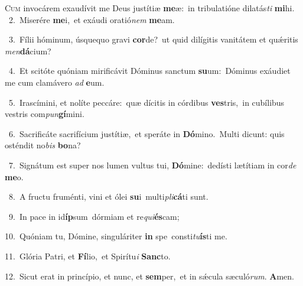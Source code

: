 \lettrine{\initial\textcolor{\initialcolor}{C}}{um} invocárem exaudívit me Deus justítiæ \textbf{me}\-æ:~\star in tribulatióne dilatás\textit{ti} \textbf{mi}\-hi.\\
{\numbfont\textcolor{\numbcolor}{~2.}}~Miserére \textbf{me}\-i,~\star et exáudi oratió\textit{nem} \textbf{me}\-am.\par
{\numbfont\textcolor{\numbcolor}{~3.}}~Fílii hóminum, úsquequo gravi \textbf{cor}\-de?~\star ut quid dilígitis vanitátem et quǽritis \textit{men}\-\textbf{dá}cium?\par
{\numbfont\textcolor{\numbcolor}{~4.}}~Et scitóte quóniam mirificávit Dóminus sanctum \textbf{su}\-um:~\star Dóminus exáudiet me cum clamávero \textit{ad} \textbf{e}\-um.\par
{\numbfont\textcolor{\numbcolor}{~5.}}~Irascímini, et nolíte peccáre:~\dagger quæ dícitis in córdibus \textbf{ves}\-tris,~\star in cubílibus vestris com\-\textit{pun}\-\textbf{gí}mini.\par
{\numbfont\textcolor{\numbcolor}{~6.}}~Sacrificáte sacrifícium justítiæ,~\dagger et speráte in \textbf{Dó}\-mino.~\star Multi dicunt: quis osténdit no\textit{bis} \textbf{bo}\-na?\par
{\numbfont\textcolor{\numbcolor}{~7.}}~Signátum est super nos lumen vultus tui, \textbf{Dó}\-mine:~\star dedísti lætítiam in cor\textit{de} \textbf{me}\-o.\par
{\numbfont\textcolor{\numbcolor}{~8.}}~A fructu fruménti, vini et ólei \textbf{su}\-i~\star multi\-\textit{pli}\-\textbf{cá}ti sunt.\par
{\numbfont\textcolor{\numbcolor}{~9.}}~In pace in id\-\textbf{íp}\-sum~\star dórmiam et re\-\textit{qui}\-\textbf{és}cam;\par
{\numbfont\textcolor{\numbcolor}{10.}}~Quóniam tu, Dómine, singuláriter \textbf{in} spe~\star consti\-\textit{tu}\-\textbf{ís}ti me.\par
{\numbfont\textcolor{\numbcolor}{11.}}~Glória Patri, et \textbf{Fí}\-lio,~\star et Spirítu\textit{i} \textbf{Sanc}\-to.\par
{\numbfont\textcolor{\numbcolor}{12.}}~Sicut erat in princípio, et nunc, et \textbf{sem}\-per,~\star et in sǽcula sæculó\-\textit{rum}\-. \textbf{A}\-men.\par

